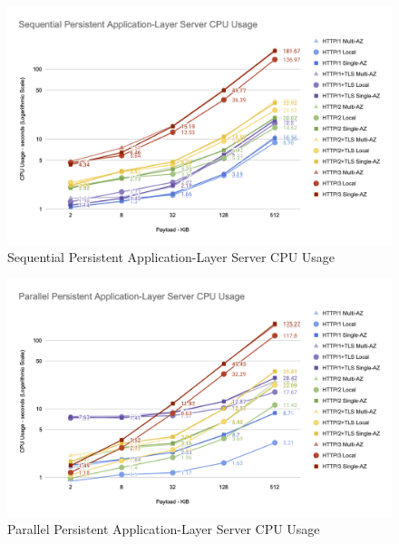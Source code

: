 \begin{figure}[h!]
    \centering
    \includegraphics[width=\linewidth]{figures/charts/Sequential Persistent Application-Layer Server CPU Usage.png}
    \caption{Sequential Persistent Application-Layer Server CPU Usage}
    \label{fig:sequential_server_app_cpu}
\end{figure}
\begin{figure}[h!]
    \centering
    \includegraphics[width=\linewidth]{figures/charts/Parallel Persistent Application-Layer Server CPU Usage.png}
    \caption{Parallel Persistent Application-Layer Server CPU Usage}
    \label{fig:parallel_server_app_cpu}
\end{figure}
